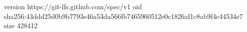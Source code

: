 version https://git-lfs.github.com/spec/v1
oid sha256:43ddd25d0b9b7793e46a53da566fb7465960512e0c1826af1c8ab9f4c44534e7
size 428412

